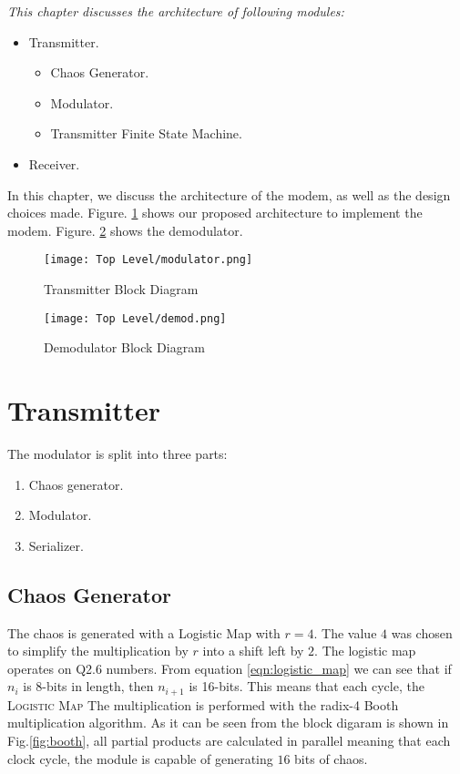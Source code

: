 \vfill
\textit{This chapter discusses the architecture of following modules:}
\begin{itemize}
    \item Transmitter.
    \begin{itemize}
        \item Chaos Generator.
        \item Modulator.
        \item Transmitter Finite State Machine.
    \end{itemize}
    \item Receiver.

\end{itemize}
\vfill


\newpage
In this chapter, we discuss the architecture of the modem, as well as the design choices made. Figure. \ref{fig:full_mod} shows our proposed architecture to implement the modem. Figure. \ref{fig:dmod} shows the demodulator.


\begin{figure}[p]
    \label{fig:full_mod}
    \caption{Transmitter Block Diagram}
    \texttt{[image: Top Level/modulator.png]}
\end{figure}

\begin{figure}[p]
    \label{fig:dmod}
    \caption{Demodulator Block Diagram}
    \texttt{[image: Top Level/demod.png]}
\end{figure}

\section{Transmitter}
The modulator is split into three parts:
\begin{enumerate}
    \item Chaos generator.
    \item Modulator.
    \item Serializer.
\end{enumerate}

\subsection{Chaos Generator}
The chaos is generated with a Logistic Map with $r = 4$. The value $4$ was chosen to simplify the multiplication by $r$ into a shift left by
$2$. The logistic map operates on Q2.6 numbers. From equation \ref{eqn:logistic_map} we can see that if $n_{i}$ is 8-bits in length,
then $n_{i+1}$ is 16-bits. This means that each cycle, the \textsc{Logistic Map} The multiplication is performed with the radix-4 Booth multiplication algorithm. As it
can be seen from the block digaram is shown in Fig.\ref{fig:booth}, all partial products are calculated in parallel meaning that each clock cycle, the module is capable
of generating $16$ bits of chaos.

